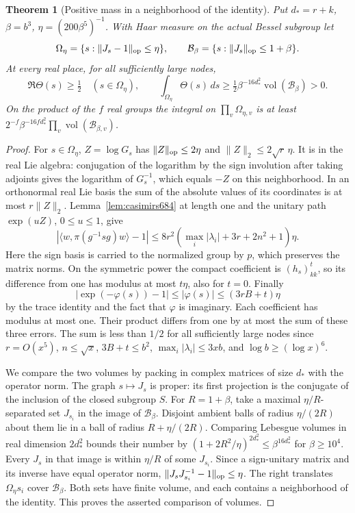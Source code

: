 \documentclass[a4paper,11pt]{article}
\newtheorem{theorem}[proposition]{Theorem}
\theoremstyle{definition}
\theoremstyle{remark}
\numberwithin{equation}{section}
\begin{document}
\begin{theorem}[Positive mass in a neighborhood of the identity]\leavevmode
\label{thm:positivecore696}
Put \(d_*=r+k\), \(\beta=b^3\), \(\eta=(200\beta^5)^{-1}\).
With Haar measure on the actual Bessel subgroup let
\[
    \Omega_\eta=\{s:\|J_s-1\|_{\rm op}\le\eta\},\qquad
    \mathcal B_\beta=\{s:\|J_s\|_{\rm op}\le1+\beta\}.
\]
At every real place, for all sufficiently large nodes,
\[
   \Re\Theta(s)\ge\tfrac12\quad(s\in\Omega_\eta),\qquad
   \int_{\Omega_\eta}\Theta(s)\,ds
        \ge\tfrac12\beta^{-16d_*^2}\operatorname{vol}(\mathcal B_\beta)>0 .
\]
On the product of the \(f\) real groups the integral on
\(\prod_v\Omega_{\eta,v}\) is at least
\(2^{-f}\beta^{-16fd_*^2}\prod_v\operatorname{vol}(\mathcal B_{\beta,v})\).
\end{theorem}
\begin{proof}
For \(s\in\Omega_\eta\), \(Z=\log G_s\) has
\(\|Z\|_{\rm op}\le2\eta\) and \(\|Z\|_2\le2\sqrt r\,\eta\).
It is in the real Lie algebra: conjugation of the logarithm
by the sign involution after taking adjoints gives the
logarithm of \(G_s^{-1}\), which equals \(-Z\) on this
neighborhood. In an orthonormal real Lie basis the sum of
the absolute values of its coordinates is at most \(r\|Z\|_2\).
Lemma~\ref{lem:casimirs684} at length one and the unitary path
\(\exp(uZ)\), \(0\le u\le1\), give
\[
  |\langle w,\pi(g^{-1}sg)w\rangle-1|
       \le 8r^2(\max_i|\lambda_i|+3r+2n^2+1)\eta .
\]
Here the sign basis is carried to the normalized group by
\(p\), which preserves the matrix norms. On the symmetric
power the compact coefficient is \((h_s)_{kk}^t\), so its
difference from one has modulus at most \(t\eta\), also for
\(t=0\). Finally
\[
     |\exp(-\varphi(s))-1|\le|\varphi(s)|
                            \le (3rB+t)\eta
\]
by the trace identity and the fact that \(\varphi\) is imaginary.
Each coefficient has modulus at most one. Their product
differs from one by at most the sum of these three errors.
The sum is less than \(1/2\) for all sufficiently large nodes
since \(r=O(x^5)\), \(n\le\sqrt{x}\), \(3B+t\le b^2\),
\(\max_i|\lambda_i|\le 3xb\), and \(\log b\ge(\log x)^6\).

We compare the two volumes by packing in complex matrices
of size \(d_*\) with the operator norm. The graph
\(s\mapsto J_s\) is proper: its first projection is the
conjugate of the inclusion of the closed subgroup \(S\).
For \(R=1+\beta\), take a maximal \(\eta/R\)-separated
set \(J_{s_i}\) in the image of \(\mathcal B_\beta\).
Disjoint ambient balls of radius \(\eta/(2R)\) about them
lie in a ball of radius \(R+\eta/(2R)\). Comparing
Lebesgue volumes in real dimension \(2d_*^2\) bounds their
number by \((1+2R^2/\eta)^{2d_*^2}\le\beta^{16d_*^2}\)
for \(\beta\ge10^4\). Every \(J_s\) in that image is within
\(\eta/R\) of some \(J_{s_i}\). Since a sign-unitary matrix
and its inverse have equal operator norm,
\(\|J_s J_{s_i}^{-1}-1\|_{\rm op}\le\eta\).
The right translates \(\Omega_\eta s_i\) cover
\(\mathcal B_\beta\). Both sets have finite volume, and
each contains a neighborhood of the identity. This proves
the asserted comparison of volumes.


\end{proof}
\end{document}
